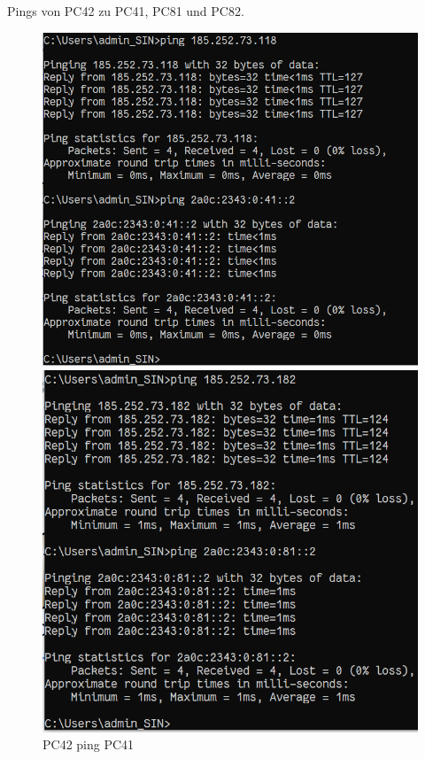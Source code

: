 \documentclass{article}
\begin{document}
Pings von PC42 zu PC41, PC81 und PC82.\\
\begin{figure}[!htp]
  \centering
  \begin{minipage}[b]{0.25\textwidth}
    \includegraphics[width=\textwidth]{Arbeitsergebnisse/pc42/pc42_ping_pc41.PNG}
    \caption{PC42 ping PC41}
  \end{minipage}
  \hspace{0.8cm}
  \begin{minipage}[b]{0.25\textwidth}
    \includegraphics[width=\textwidth]{Arbeitsergebnisse/pc42/pc42_ping_pc81.PNG}

\end{minipage}
\end{figure}
\end{document}
